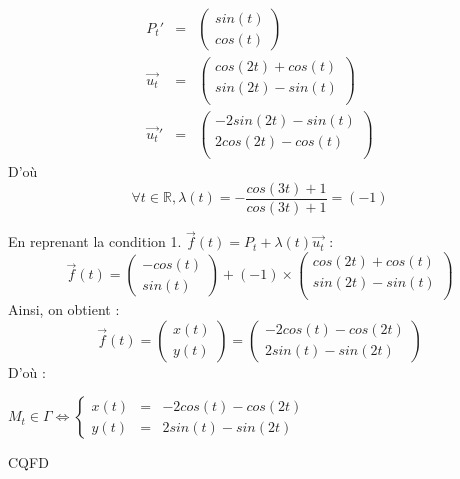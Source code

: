 \begin{enumerate}[label=\arabic*. ]
        \[
          \begin{array}{rcl}
            P_t'                  & = &
            \left(
            \begin{array}{c}
                sin(t) \\cos(t)
              \end{array}
            \right)                     \\
            \overrightarrow{u_t}  & = &
            \left(
            \begin{array}{c}
                cos(2t) + cos(t) \\
                sin(2t) - sin(t) \\
              \end{array}
            \right)                     \\
            \overrightarrow{u_t}' & = &
            \left(
            \begin{array}{c}
                -2sin(2t) - sin(t) \\
                2cos(2t) - cos(t)  \\
              \end{array}
            \right)
          \end{array}
        \]
        D'où
        \[
          \forall t\in\mathbb{R},\lambda(t) = -\frac{cos(3t) + 1}{cos(3t) + 1} = (-1)
        \]
\end{enumerate}
En reprenant la condition 1. $\overrightarrow{f}(t) = P_t + \lambda(t)\overrightarrow{u_t}$ :
\[
  \overrightarrow{f}(t) =
  \left(
  \begin{array}{c}
      -cos(t) \\
      sin(t)
    \end{array}
  \right)
  +
  (-1)
  \times
  \left(
  \begin{array}{c}
      cos(2t) + cos(t) \\
      sin(2t) - sin(t) \\
    \end{array}
  \right)
\]
Ainsi, on obtient :
\[
  \overrightarrow{f}(t) =
  \left(
  \begin{array}{c}
      x(t) \\
      y(t)
    \end{array}
  \right) =
  \left(
  \begin{array}{c}
      -2cos(t)-cos(2t) \\
      2sin(t)-sin(2t)
    \end{array}
  \right)
\]
D'où :
\begin{result}
  $M_t\in\Gamma\iff\left\{
    \begin{array}{rcl}
      x(t) & = & -2cos(t)-cos(2t) \\
      y(t) & = & 2sin(t)-sin(2t)
    \end{array}
    \right.$
\end{result}

\begin{flushright}
  CQFD
\end{flushright}
